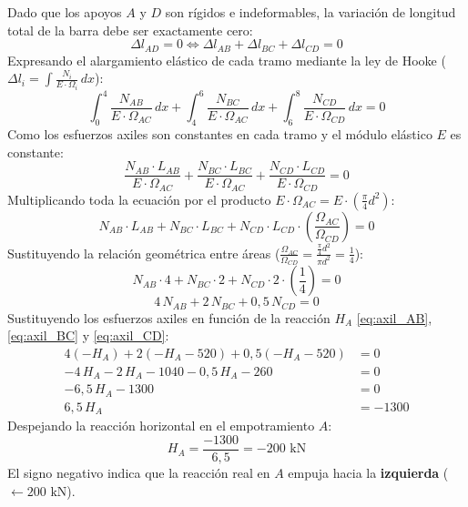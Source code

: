 Dado que los apoyos $A$ y $D$ son rígidos e indeformables, la variación de longitud total de la barra debe ser exactamente cero:
\begin{equation}
    \Delta l_{AD} = 0 \iff \Delta l_{AB} + \Delta l_{BC} + \Delta l_{CD} = 0
\end{equation}
Expresando el alargamiento elástico de cada tramo mediante la ley de Hooke ($\Delta l_i = \int \frac{N_i}{E \cdot \Omega_i}\,dx$):
\begin{equation}
    \int_{0}^{4} \frac{N_{AB}}{E \cdot \Omega_{AC}}\,dx + \int_{4}^{6} \frac{N_{BC}}{E \cdot \Omega_{AC}}\,dx + \int_{6}^{8} \frac{N_{CD}}{E \cdot \Omega_{CD}}\,dx = 0
\end{equation}
Como los esfuerzos axiles son constantes en cada tramo y el módulo elástico $E$ es constante:
\begin{equation}
    \frac{N_{AB} \cdot L_{AB}}{E \cdot \Omega_{AC}} + \frac{N_{BC} \cdot L_{BC}}{E \cdot \Omega_{AC}} + \frac{N_{CD} \cdot L_{CD}}{E \cdot \Omega_{CD}} = 0
\end{equation}
Multiplicando toda la ecuación por el producto $E \cdot \Omega_{AC} = E \cdot \left(\frac{\pi}{4}d^2\right)$:
\begin{equation}
    N_{AB} \cdot L_{AB} + N_{BC} \cdot L_{BC} + N_{CD} \cdot L_{CD} \cdot \left(\frac{\Omega_{AC}}{\Omega_{CD}}\right) = 0
\end{equation}
Sustituyendo la relación geométrica entre áreas ($\frac{\Omega_{AC}}{\Omega_{CD}} = \frac{\frac{\pi}{4}d^2}{\pi d^2} = \frac{1}{4}$):
\begin{equation}
    N_{AB} \cdot 4 + N_{BC} \cdot 2 + N_{CD} \cdot 2 \cdot \left(\frac{1}{4}\right) = 0
\end{equation}
\begin{equation}
    4\,N_{AB} + 2\,N_{BC} + 0{,}5\,N_{CD} = 0
    \label{eq:compatibilidad_reducida}
\end{equation}
Sustituyendo los esfuerzos axiles en función de la reacción $H_A$ \eqref{eq:axil_AB}, \eqref{eq:axil_BC} y \eqref{eq:axil_CD}:
\begin{align}
    4(-H_A) + 2(-H_A - 520) + 0{,}5(-H_A - 520) & = 0 \nonumber \\
    -4\,H_A - 2\,H_A - 1040 - 0{,}5\,H_A - 260    & = 0 \nonumber \\
    -6{,}5\,H_A - 1300                           & = 0 \nonumber \\
    6{,}5\,H_A                                   & = -1300
\end{align}
Despejando la reacción horizontal en el empotramiento $A$:
\begin{equation}
    \boxed{H_A = \frac{-1300}{6{,}5} = -200\text{ kN}}
\end{equation}
El signo negativo indica que la reacción real en $A$ empuja hacia la \textbf{izquierda} ($\leftarrow 200\text{ kN}$).

